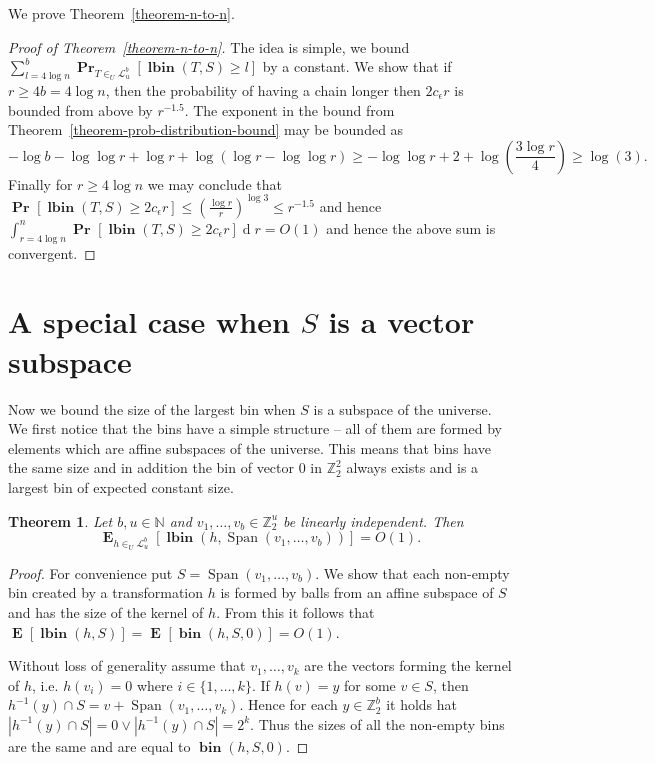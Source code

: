 \documentclass{article}
\newcommand{\bin}[3]{\operatorname{\mathbf{bin}}({#1}, {#2}, {#3})}
\newcommand{\lbin}[2]{\operatorname{\mathbf{lbin}}({#1}, {#2})}
\newcommand{\vecspace}[2]{\mathbb{Z}_{#1}^{#2}}
\newcommand{\binvecspace}[1]{\vecspace{2}{#1}}
\newcommand{\linearmaps}[2]{\mathcal{L}_{#1}^{#2}}
\newcommand{\probs}[2]{\operatorname{\mathbf{Pr}}_{{#1}}\left[{#2}\right]}
\newcommand{\prob}[1]{\probs{}{#1}}
\newcommand{\expects}[2]{\operatorname{\mathbf{E}}_{{#1}}\left[{#2}\right]}
\newcommand{\expect}[1]{\expects{}{#1}}
\newtheorem{theorem}{Theorem}
\begin{document}
We prove Theorem~\ref{theorem-n-to-n}.
\begin{proof}[Proof of Theorem~\ref{theorem-n-to-n}]
The idea is simple, we bound $\sum_{l = 4\log n}^{b} \probs{T\in_U\linearmaps{u}{b}}{\lbin{T}{S} \geq l}$ by a constant.
We show that if $r \geq 4b = 4\log n$, then the probability of having a chain longer then $2 c_\epsilon r$ is bounded from above by $r^{-1.5}$.
The exponent in the bound from Theorem~\ref{theorem-prob-distribution-bound} may be bounded as
\[
-\log b - \log \log r + \log r + \log (\log r - \log \log r) \geq -\log \log r + 2 + \log \left(\frac{3\log r}{4}\right) \geq \log(3).
\]
Finally for $r \geq 4\log n$ we may conclude that $\prob{\lbin{T}{S} \geq 2c_\epsilon r} \leq \left(\frac{\log r}{r}\right)^{\log 3} \leq r^{-1.5}$ and hence $\int_{r = 4\log n}^{n} \prob{\lbin{T}{S} \geq 2c_\epsilon r} \operatorname{d}r = O(1)$ and hence the above sum is convergent.
\end{proof}

\section{A special case when $S$ is a vector subspace}

Now we bound the size of the largest bin when $S$ is a subspace of the universe.
We first notice that the bins have a simple structure -- all of them are formed by elements which are affine subspaces of the universe.
This means that bins have the same size and in addition the bin of vector $0$ in $\binvecspace{2}$ always exists and is a largest bin of expected constant size.

\begin{theorem}
Let $b, u \in \mathbb{N}$ and $v_1, \dots, v_b \in \mathbb{Z}_2^u$ be linearly independent. Then \[ \expects{h \in_U \linearmaps{u}{b}}{\lbin{h}{\operatorname{Span}(v_1, \dots, v_b)}} = O(1) .\]
\end{theorem}
\begin{proof}
For convenience put $S = \operatorname{Span}(v_1, \dots, v_b)$. 
We show that each non-empty bin created by a transformation $h$ is formed by balls from an affine subspace of $S$ and has the size of the kernel of $h$.
From this it follows that $\expect{\lbin{h}{S}} = \expect{\bin{h}{S}{0}} = O(1)$.

Without loss of generality assume that $v_1, \dots, v_k$ are the vectors forming the kernel of $h$, i.e. $h(v_i) = 0$ where $i \in \{1, \dots, k\}$.
If $h(v) = y$ for some $v \in S$, then $h^{-1}(y) \cap S = v + \operatorname{Span}(v_1, \dots, v_k)$.
Hence for each $y \in \mathbb{Z}_2^b$ it holds hat $|h^{-1}(y) \cap S| = 0 \vee |h^{-1}(y) \cap S| = 2^k$.
Thus the sizes of all the non-empty bins are the same and are equal to $\bin{h}{S}{0}$.
\end{proof}
\end{document}
